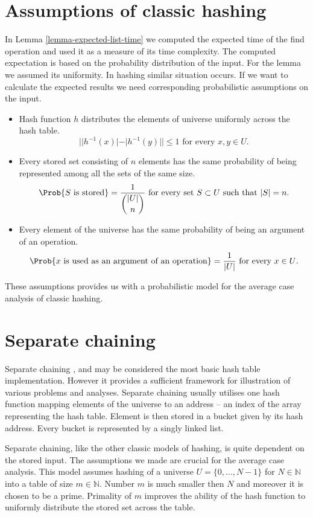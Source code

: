 \section{Assumptions of classic hashing}
In Lemma \ref{lemma-expected-list-time} we computed the expected time of the find operation and used it as a measure of its time complexity. The computed expectation is based on the probability distribution of the input. For the lemma we assumed its uniformity. In hashing similar situation occurs. If we want to calculate the expected results we need corresponding probabilistic assumptions on the input.
\begin{itemize}
\item Hash function $h$ distributes the elements of universe uniformly across the hash table.
\[
||h^{-1}(x)| - |h^{-1}(y)|| \leq 1 \text{ for every }x, y \in U \text{.}
\]
\item Every stored set consisting of $n$ elements has the same probability of being represented among all the sets of the same size.
\[
\Prob{S \text{ is stored}} = \frac{1}{\dbinom{|U|}{n}} \text{ for every set } S \subset U \text{ such that } |S| = n \text{.}
\]
\item Every element of the universe has the same probability of being an argument of an operation.
\[
\Prob{x \text{ is used as an argument of an operation}} = \frac{1}{|U|} \text{ for every } x \in U \text{.}
\]
\end{itemize}

These assumptions provides us with a probabilistic model for the average case analysis of classic hashing.

\section{Separate chaining}
Separate chaining \cite{The-art-of-computer-programming}, \cite{DBLP:books/sp/Mehlhorn84} and \cite{DBLP:books/sp/MehlhornS2008} may be considered the most basic hash table implementation. However it provides a sufficient framework for illustration of various problems and analyses. Separate chaining usually utilises one hash function mapping elements of the universe to an address -- an index of the array representing the hash table. Element is then stored in a bucket given by its hash address. Every bucket is represented by a singly linked list. 

Separate chaining, like the other classic models of hashing, is quite dependent on the stored input. The assumptions we made are crucial for the average case analysis. This model assumes hashing of a universe $U = \{0, \dots, N - 1\}$ for $N \in \mathbb{N}$ into a table of size $m \in \mathbb{N}$. Number $m$ is much smaller then $N$ and moreover it is chosen to be a prime. Primality of $m$ improves the ability of the hash function to uniformly distribute the stored set across the table. 

